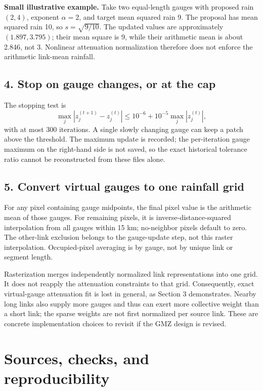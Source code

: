 \documentclass[11pt,a4paper]{article}
\begin{document}
\textbf{Small illustrative example.} Take two equal-length gauges with proposed rain $(2,4)$, exponent $\alpha=2$, and target mean squared rain 9. The proposal has mean squared rain 10, so $s=\sqrt{9/10}$. The updated values are approximately $(1.897,3.795)$; their mean square is 9, while their arithmetic mean is about 2.846, not 3. Nonlinear attenuation normalization therefore does not enforce the arithmetic link-mean rainfall.

\subsection*{4. Stop on gauge changes, or at the cap}
The stopping test is
\[
 \max_j|z_j^{(t+1)}-z_j^{(t)}|
 \leq 10^{-6}+10^{-5}\max_j|z_j^{(t)}|,
\]
with at most 300 iterations. A single slowly changing gauge can keep a patch above the threshold. The maximum update is recorded; the per-iteration gauge maximum on the right-hand side is not saved, so the exact historical tolerance ratio cannot be reconstructed from these files alone.

\subsection*{5. Convert virtual gauges to one rainfall grid}
For any pixel containing gauge midpoints, the final pixel value is the arithmetic mean of those gauges. For remaining pixels, it is inverse-distance-squared interpolation from all gauges within 15 km; no-neighbor pixels default to zero. The other-link exclusion belongs to the gauge-update step, not this raster interpolation. Occupied-pixel averaging is by gauge, not by unique link or segment length.

Rasterization merges independently normalized link representations into one grid. It does not reapply the attenuation constraints to that grid. Consequently, exact virtual-gauge attenuation fit is lost in general, as Section 3 demonstrates. Nearby long links also supply more gauges and thus can exert more collective weight than a short link; the sparse weights are not first normalized per source link. These are concrete implementation choices to revisit if the GMZ design is revised.

\clearpage
\section{Sources, checks, and reproducibility}
\end{document}

